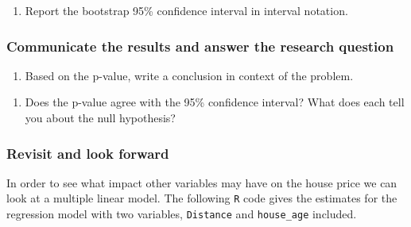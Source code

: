 \documentclass[
]{report}
\providecommand{\tightlist}{%
  \setlength{\itemsep}{0pt}\setlength{\parskip}{0pt}}
\begin{document}
\begin{enumerate}
\def\labelenumi{\arabic{enumi}.}
\setcounter{enumi}{13}
\tightlist
\item
  Report the bootstrap 95\% confidence interval in interval notation.\\
  \vspace{0.5in}
\end{enumerate}

\hypertarget{communicate-the-results-and-answer-the-research-question-5}{%
\subsubsection*{Communicate the results and answer the research question}\label{communicate-the-results-and-answer-the-research-question-5}}

\begin{enumerate}
\def\labelenumi{\arabic{enumi}.}
\setcounter{enumi}{14}
\tightlist
\item
  Based on the p-value, write a conclusion in context of the problem.
\end{enumerate}

\vspace{.8in}

\begin{enumerate}
\def\labelenumi{\arabic{enumi}.}
\setcounter{enumi}{15}
\tightlist
\item
  Does the p-value agree with the 95\% confidence interval? What does each tell you about the null hypothesis?
\end{enumerate}

\vspace{.6in}

\hypertarget{revisit-and-look-forward}{%
\subsubsection*{Revisit and look forward}\label{revisit-and-look-forward}}

In order to see what impact other variables may have on the house price we can look at a multiple linear model. The following \texttt{R} code gives the estimates for the regression model with two variables, \texttt{Distance} and \texttt{house\_age} included.
\end{document}
